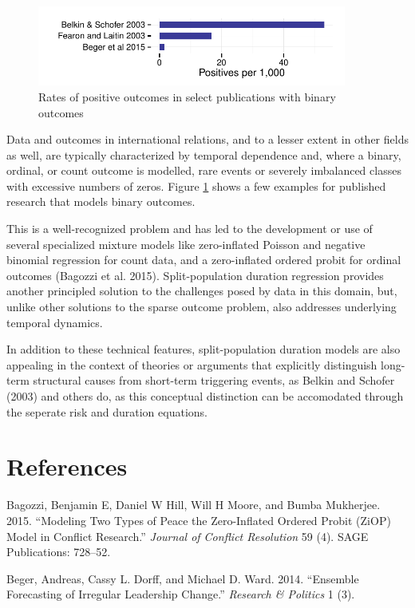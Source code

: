 \documentclass[article]{jss}
\begin{document}
\begin{figure}[htbp!]
\centering
\includegraphics[width = 4in]{graphics/rates.pdf}
\caption{Rates of positive outcomes in select publications with binary outcomes}
\label{rates}
\end{figure}

Data and outcomes in international relations, and to a lesser extent in
other fields as well, are typically characterized by temporal dependence
and, where a binary, ordinal, or count outcome is modelled, rare events
or severely imbalanced classes with excessive numbers of zeros. Figure
\ref{rates} shows a few examples for published research that models
binary outcomes.

This is a well-recognized problem and has led to the development or use
of several specialized mixture models like zero-inflated Poisson and
negative binomial regression for count data, and a zero-inflated ordered
probit for ordinal outcomes (Bagozzi et al. 2015). Split-population
duration regression provides another principled solution to the
challenges posed by data in this domain, but, unlike other solutions to
the sparse outcome problem, also addresses underlying temporal dynamics.

In addition to these technical features, split-population duration
models are also appealing in the context of theories or arguments that
explicitly distinguish long-term structural causes from short-term
triggering events, as Belkin and Schofer (2003) and others do, as this
conceptual distinction can be accomodated through the seperate risk and
duration equations.

\section*{References}\label{references}

Bagozzi, Benjamin E, Daniel W Hill, Will H Moore, and Bumba Mukherjee.
2015. ``Modeling Two Types of Peace the Zero-Inflated Ordered Probit
(ZiOP) Model in Conflict Research.'' \emph{Journal of Conflict
Resolution} 59 (4). SAGE Publications: 728--52.

Beger, Andreas, Cassy L. Dorff, and Michael D. Ward. 2014. ``Ensemble
Forecasting of Irregular Leadership Change.'' \emph{Research \&
Politics} 1 (3).
\end{document}
